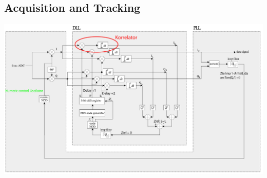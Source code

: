 %    
\subsection{Acquisition and Tracking}

	\begin{center}
    	\includegraphics[width=14cm]{./bilder/GPS-Phasenlock.jpg}\\
    \end{center}

